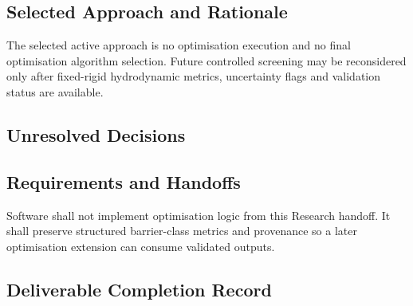 \subsection{Selected Approach and Rationale}
\label{sec:res-opt-spec-selected-approach}

The selected active approach is no optimisation execution and no final
optimisation algorithm selection. Future controlled screening may be
reconsidered only after fixed-rigid hydrodynamic metrics, uncertainty
flags and validation status are available.

\subsection{Unresolved Decisions}
\label{sec:res-opt-spec-unresolved-decisions}


\subsection{Requirements and Handoffs}
\label{sec:res-opt-spec-requirements}

Software shall not implement optimisation logic from this Research
handoff. It shall preserve structured barrier-class metrics and
provenance so a later optimisation extension can consume validated
outputs.

\subsection{Deliverable Completion Record}
\label{sec:res-opt-spec-completion-record}

%
%
%
